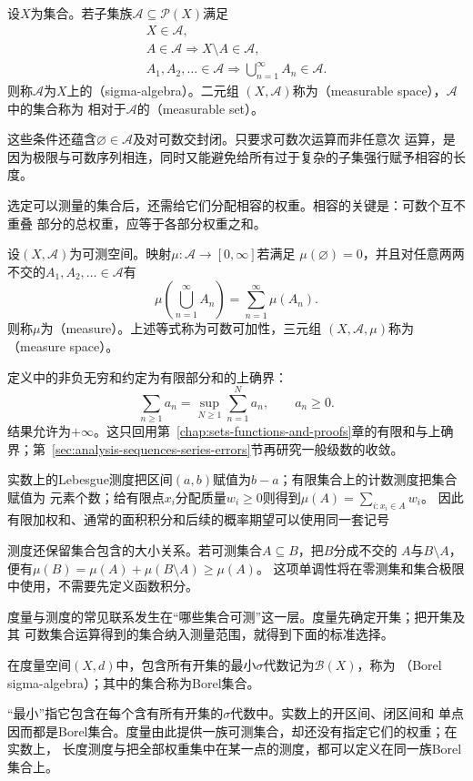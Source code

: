 \begin{definition}
\label{def:analysis-sigma-algebra}
设$X$为集合。若子集族$\mathcal{A}\subseteq\mathcal{P}(X)$满足
\[
  \begin{gathered}
    X\in\mathcal{A},\\
    A\in\mathcal{A}\Longrightarrow X\setminus A\in\mathcal{A},\\
    A_1,A_2,\ldots\in\mathcal{A}
    \Longrightarrow\bigcup_{n=1}^{\infty}A_n\in\mathcal{A}.
  \end{gathered}
\]
则称$\mathcal{A}$为$X$上的（sigma-algebra）。二元组
$(X,\mathcal{A})$称为（measurable space），$\mathcal{A}$中的集合称为
相对于$\mathcal{A}$的（measurable set）。
\end{definition}
这些条件还蕴含$\varnothing\in\mathcal{A}$及对可数交封闭。只要求可数次运算而非任意次
运算，是因为极限与可数序列相连，同时又能避免给所有过于复杂的子集强行赋予相容的长度。

选定可以测量的集合后，还需给它们分配相容的权重。相容的关键是：可数个互不重叠
部分的总权重，应等于各部分权重之和。
\begin{definition}[测度与测度空间]
\label{def:analysis-measure-space}
设$(X,\mathcal{A})$为可测空间。映射$\mu:\mathcal{A}\to[0,\infty]$若满足
$\mu(\varnothing)=0$，并且对任意两两不交的$A_1,A_2,\ldots\in\mathcal{A}$有
\[   \mu\left(\bigcup_{n=1}^{\infty}A_n\right)   =   \sum_{n=1}^{\infty}\mu(A_n). \]
则称$\mu$为（measure）。上述等式称为可数可加性，三元组
$(X,\mathcal{A},\mu)$称为（measure space）。
\end{definition}
定义中的非负无穷和约定为有限部分和的上确界：
\[
  \sum_{n\geq1}a_n=\sup_{N\geq1}\sum_{n=1}^N a_n,\qquad a_n\geq0.
\]
结果允许为$+\infty$。这只回用第~\ref{chap:sets-functions-and-proofs}章的有限和与上确界；第~\ref{sec:analysis-sequences-series-errors}节再研究一般级数的收敛。

实数上的Lebesgue测度把区间$(a,b)$赋值为$b-a$；有限集合上的计数测度把集合赋值为
元素个数；给有限点$x_i$分配质量$w_i\geq0$则得到$\mu(A)=\sum_{i:x_i\in A}w_i$。
因此有限加权和、通常的面积积分和后续的概率期望可以使用同一套记号

测度还保留集合包含的大小关系。若可测集合$A\subseteq B$，把$B$分成不交的
$A$与$B\setminus A$，便有$\mu(B)=\mu(A)+\mu(B\setminus A)\geq\mu(A)$。
这项单调性将在零测集和集合极限中使用，不需要先定义函数积分。


度量与测度的常见联系发生在“哪些集合可测”这一层。度量先确定开集；把开集及其
可数集合运算得到的集合纳入测量范围，就得到下面的标准选择。
\begin{definition}
\label{def:analysis-borel-sigma-algebra}
在度量空间$(X,d)$中，包含所有开集的最小$\sigma$代数记为$\mathcal{B}(X)$，称为
（Borel sigma-algebra）；其中的集合称为Borel集合。
\end{definition}
“最小”指它包含在每个含有所有开集的$\sigma$代数中。实数上的开区间、闭区间和
单点因而都是Borel集合。度量由此提供一族可测集合，却还没有指定它们的权重；在实数上，
长度测度与把全部权重集中在某一点的测度，都可以定义在同一族Borel集合上。

